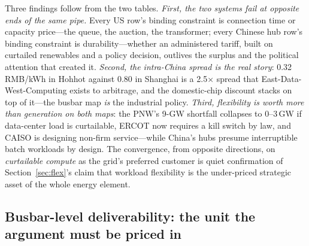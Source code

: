 Three findings follow from the two tables. \emph{First, the two systems fail at opposite ends of the same pipe.} Every US row's binding constraint is connection time or capacity price---the queue, the auction, the transformer; every Chinese hub row's binding constraint is durability---whether an administered tariff, built on curtailed renewables and a policy decision, outlives the surplus and the political attention that created it. \emph{Second, the intra-China spread is the real story}: 0.32 RMB/kWh in Hohhot against 0.80 in Shanghai is a 2.5$\times$ spread that East-Data-West-Computing exists to arbitrage, and the domestic-chip discount stacks on top of it---the busbar map \emph{is} the industrial policy. \emph{Third, flexibility is worth more than generation on both maps}: the PNW's 9-GW shortfall collapses to 0--3\,GW if data-center load is curtailable, ERCOT now requires a kill switch by law, and CAISO is designing non-firm service---while China's hubs presume interruptible batch workloads by design. The convergence, from opposite directions, on \emph{curtailable compute} as the grid's preferred customer is quiet confirmation of Section~\ref{sec:flex}'s claim that workload flexibility is the under-priced strategic asset of the whole energy element.

\subsection{Busbar-level deliverability: the unit the argument must be priced in}
\label{sec:busbar}

